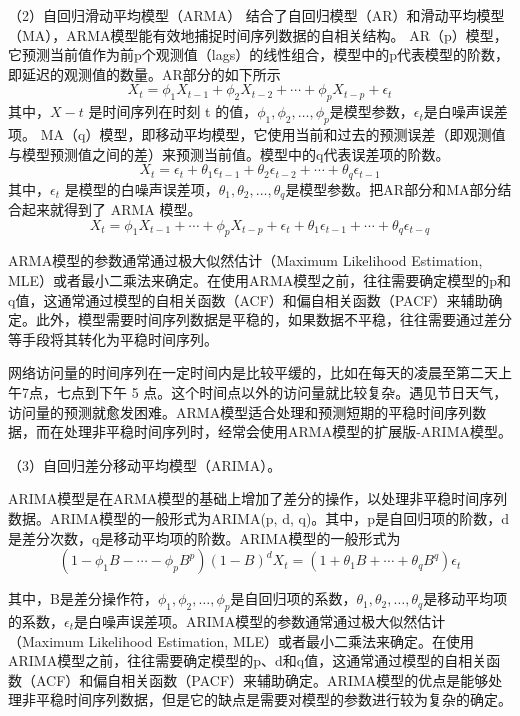 （2）自回归滑动平均模型\cite{贾钟研2020基于时间序列的网络流量分析与预测}（ARMA）
结合了自回归模型（AR）和滑动平均模型（MA），ARMA模型能有效地捕捉时间序列数据的自相关结构。
AR（p）模型，它预测当前值作为前p个观测值（lags）的线性组合，模型中的p代表模型的阶数，
即延迟的观测值的数量。AR部分的如下所示
\begin{equation}
  X_t = \phi_1X_{t-1} + \phi_2X_{t - 2} + \cdots + \phi_pX_{t-p} + \epsilon_t
\end{equation}
其中，$X-t$ 是时间序列在时刻 t 的值，$\phi_1, \phi_2,\ldots,\phi_p$是模型参数，$\epsilon_t$是白噪声误差项。
MA（q）模型，即移动平均模型，它使用当前和过去的预测误差（即观测值与模型预测值之间的差）来预测当前值。模型中的q代表误差项的阶数。
\begin{equation}
  X_t = \epsilon_t + \theta_1\epsilon_{t-1} + \theta_2\epsilon_{t-2} + \cdots + \theta_q\epsilon_{t-1}
\end{equation}
其中，$\epsilon_t$ 是模型的白噪声误差项，$\theta_1, \theta_2, \ldots, \theta_q$是模型参数。把AR部分和MA部分结合起来就得到了 ARMA 模型。
\begin{equation}
  X_t = \phi_1X_{t-1} + \cdots  + \phi_pX_{t-p} + \epsilon_t + \theta_1\epsilon_{t-1} + \cdots + \theta_q\epsilon_{t-q}
\end{equation}

ARMA模型的参数通常通过极大似然估计（Maximum Likelihood Estimation, MLE）或者最小二乘法来确定。在使用ARMA模型之前，往往需要确定模型的p和q值，这通常通过模型的自相关函数（ACF）和偏自相关函数（PACF）来辅助确定。此外，模型需要时间序列数据是平稳的，如果数据不平稳，往往需要通过差分等手段将其转化为平稳时间序列。

网络访问量的时间序列在一定时间内是比较平缓的，比如在每天的凌晨至第二天上午7点，七点到下午 5 点。这个时间点以外的访问量就比较复杂。遇见节日天气，访问量的预测就愈发困难。ARMA模型适合处理和预测短期的平稳时间序列数据，而在处理非平稳时间序列时，经常会使用ARMA模型的扩展版-ARIMA模型。

（3）自回归差分移动平均模型（ARIMA）。

ARIMA模型是在ARMA模型的基础上增加了差分的操作，以处理非平稳时间序列数据。ARIMA模型的一般形式为ARIMA(p, d, q)。其中，p是自回归项的阶数，d是差分次数，q是移动平均项的阶数。ARIMA模型的一般形式为
\begin{equation}
  (1 - \phi_1B - \cdots - \phi_pB^p)(1 - B)^dX_t = (1 + \theta_1B + \cdots + \theta_qB^q)\epsilon_t
\end{equation}

其中，B是差分操作符，$\phi_1, \phi_2, \ldots, \phi_p$是自回归项的系数，$\theta_1, \theta_2, \ldots, \theta_q$是移动平均项的系数，$\epsilon_t$是白噪声误差项。ARIMA模型的参数通常通过极大似然估计（Maximum Likelihood Estimation, MLE）或者最小二乘法来确定。在使用ARIMA模型之前，往往需要确定模型的p、d和q值，这通常通过模型的自相关函数（ACF）和偏自相关函数（PACF）来辅助确定。ARIMA模型的优点是能够处理非平稳时间序列数据，但是它的缺点是需要对模型的参数进行较为复杂的确定。

